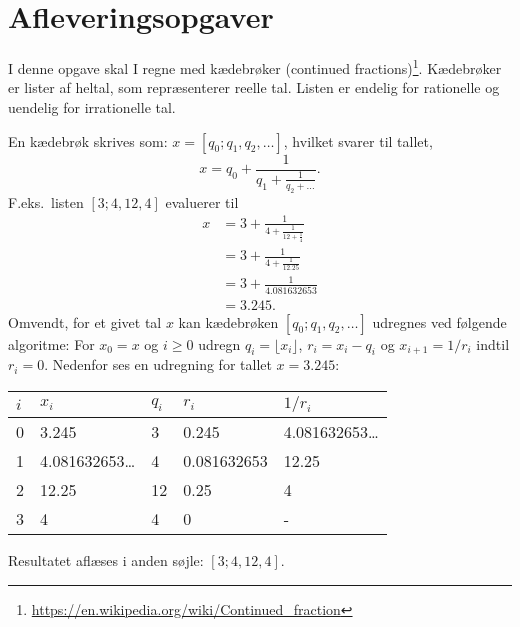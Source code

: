 \documentclass[a4paper,12pt]{article}
\begin{document}
\section*{Afleveringsopgaver}
I denne opgave skal I regne med kædebrøker (continued fractions)\footnote{\url{https://en.wikipedia.org/wiki/Continued_fraction}}. Kædebrøker er lister af heltal, som repræsenterer reelle tal. Listen er endelig for rationelle og uendelig for irrationelle tal. 

En kædebrøk skrives som:
$x = [q_0; q_1, q_2, \ldots]$, hvilket svarer til tallet,
\begin{equation}
  x = q_0 + \frac{1}{q_1 + \frac{1}{q_2 + \dots}}.
\end{equation}
F.eks.\ listen $[3;4, 12, 4]$ evaluerer til
\begin{align}
  x &= 3 + \frac{1}{4 + \frac{1}{12 + \frac{1}{4}}}
  \\&=  3 + \frac{1}{4 + \frac{1}{12.25}}
  \\&=  3 + \frac{1}{4.081632653}
  \\&=  3.245.
\end{align}
Omvendt, for et givet tal $x$ kan kædebrøken $[q_0; q_1, q_2, \ldots]$ udregnes ved følgende algoritme: For $x_0 = x$ og $i \geq 0$ udregn $q_i = \lfloor x_i \rfloor$, $r_i = x_i - q_i$ og $x_{i+1} = 1/r_i$ indtil $r_i = 0$. Nedenfor ses en udregning for tallet $x=3.245$:
\begin{center}
  \begin{tabular}{|l|l|l|l|l|}
    \hline
    $i$ & $x_i$ & $q_i$ & $r_i$ & $1/r_i$\\
    \hline
    0 & 3.245 & 3 & 0.245 & 4.081632653\ldots\\
    1 & 4.081632653\ldots & 4 & 0.081632653 & 12.25\\
    2 & 12.25 & 12 & 0.25 & 4\\
    3 & 4 & 4 & 0 & -\\
    \hline
  \end{tabular}
\end{center}
Resultatet aflæses i anden søjle: $[3; 4, 12, 4]$.
\end{document}

